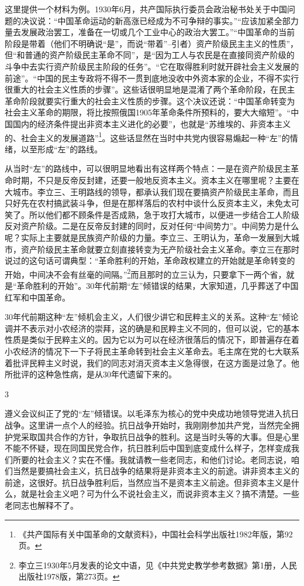 \documentclass[UTF8, 12pt, a4paper]{ctexrep}
\begin{document}
这里提供一个材料为例。1930年6月，共产国际执行委员会政治秘书处关于中国问题的决议说：“中国革命运动的新高涨已经成为不可争辩的事实。”“应该加紧全部力量去发展政治罢工，准备在一切或几个工业中心的政治大罢工。”“中国革命的当前阶段是带着（他们不明确说“是”，而说“带着”--引者）资产阶级民主主义的性质”，但“和普通的资产阶级民主革命不同”，是“因为工人与农民是在直接同资产阶级的斗争中去实行资产阶级民主阶段的任务”。“它在取得胜利时就开辟社会主义发展的前途”。“中国的民主专政将不得不一贯到底地没收中外资本家的企业，不得不实行很重大的社会主义性质的步骤”。这些话很明显地是混淆了两个革命阶段，在民主革命阶段就要实行重大的社会主义性质的步骤。这个决议还说：“中国革命转变为社会主义革命的期限，将比按照俄国1905年革命条件所预料的，要大大缩短”。“中国国内的经济条件提出非资本主义进化的必要”，也就是“苏维埃的、非资本主义的、社会主义的发展道路”\footnote{《共产国际有关中国革命的文献资料》，中国社会科学出版社1982年版，第92页。}。这些话显然在当时中共党内很容易煽起一种“左”的情绪，以至形成“左”的路线。

从当时“左”的路线中，可以很明显地看出有这样两个特点：一是在资产阶级民主革命时期，不只是反帝反封建，还要一般地反资本主义。资本主义在哪里呢？主要在大城市。李立三、王明路线的领导，都承认我们现在要搞资产阶级民主革命，而且只好先在农村搞武装斗争，但是在那样落后的农村中谈什么反资本主义，未免太可笑了。所以他们都不顾条件是否成熟，急于攻打大城市，以便进一步结合工人阶级反对资产阶级。二是在反帝反封建的同时，反对任何“中间势力”。中间势力是什么呢？实际上主要就是民族资产阶级的力量。李立三、王明认为，革命一发展到大城市，资产阶级民主革命就要立刻直接转变为无产阶级社会主义革命。李立三在那时说过的这句话可谓典型：“革命胜利的开始，革命政权建立的开始就是革命转变的开始，中间决不会有丝毫的间隔。”\footnote{李立三1930年5月发表的论文中语，见《中共党史教学参考数据》第1册，人民出版社1978版，第273页。}而且那时的立三认为，只要拿下一两个省，就是“革命胜利的开始”。30年代前期“左”倾错误的结果，大家知道，几乎葬送了中国红军和中国革命。

30年代前期这种“左”倾机会主义，人们很少讲它和民粹主义的关系。这种“左”倾论调并不表示对小农经济的崇拜，这的确是和民粹主义不同的，但可以说，它的基本性质是类似于民粹主义的。因为它以为可以在经济很落后的情况下，即普遍存在着小农经济的情况下一下子将民主革命转到社会主义革命去。毛主席在党的七大联系着批评民粹主义时说，我们的同志对消灭资本主义急得很，在这方面是过急了。他所批评的这种急性病，是从30年代遗留下来的。

3

遵义会议纠正了党的“左”倾错误。以毛泽东为核心的党中央成功地领导党进入抗日战争。这里讲一点个人的经验。抗日战争开始时，我刚刚参加共产党，当然完全拥护党采取国共合作的方针，争取抗日战争的胜利。这是当时头等的大事。但是心里不能不怀疑，现在同国民党合作，抗日胜利后中国到底变成什么样子，怎样变成我们所要的社会主义？实在不懂。我就请教一些老同志，和他们讨论。老同志说，咱们当然是要搞社会主义，抗日战争的结果将是非资本主义的前途。讲非资本主义的前途，这很好。抗日战争胜利后，当然应当不是资本主义前途。但非资本主义是什么，就是社会主义吧？可为什么不说社会主义，而说非资本主义？搞不清楚。一些老同志也解释不了。
\end{document}
